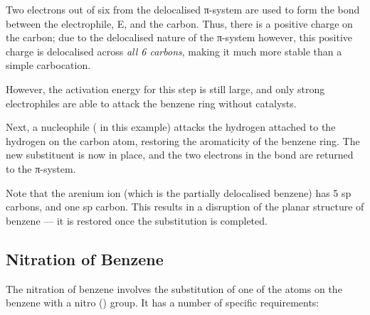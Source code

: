 	Two electrons out of six from the delocalised π-system are used to form the bond between the electrophile, E, and the carbon.
	Thus, there is a positive charge on the carbon; due to the delocalised nature of the π-system however, this positive charge is
	delocalised across \textit{all 6 carbons}, making it much more stable than a simple carbocation.

	However, the activation energy for this step is still large, and only strong electrophiles are able to attack the benzene ring without catalysts.


	\vspace{1.0em}

	Next, a nucleophile ( in this example) attacks the hydrogen attached to the hydrogen on the carbon atom,
	restoring the aromaticity of the benzene ring. The new substituent is now in place, and the two electrons in the 
	bond are returned to the π-system.




	Note that the arenium ion (which is the partially delocalised benzene) has 5 sp carbons, and one sp carbon. This
	results in a disruption of the planar structure of benzene –– it is restored once the substitution is completed.


\subsection{Nitration of Benzene}

	The nitration of benzene involves the substitution of one of the  atoms on the benzene with a nitro () group.
	It has a number of specific requirements:

